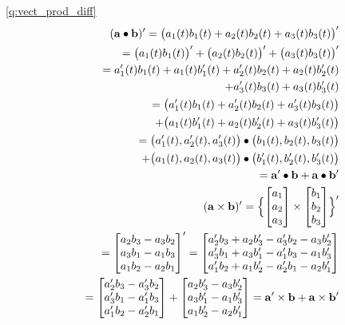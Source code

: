 \ref{q:vect_prod_diff}
\begin{eqnarray*}
&&({\bf a}\bullet{\bf b})'=\bigl(a_1(t)b_1(t)+a_2(t)b_2(t)+a_3(t)b_3(t)\bigr)'\\
&&=\bigl(a_1(t)b_1(t)\bigr)'+\bigl(a_2(t)b_2(t)\bigr)'+\bigl(a_3(t)b_3(t)\bigr)'\\
&&=a_1'(t)b_1(t)+a_1(t)b_1'(t)+a_2'(t)b_2(t)+a_2(t)b_2'(t)\\
&&\quad+a_3'(t)b_3(t)+a_3(t)b_3'(t)\\
&&=\bigl(a_1'(t)b_1(t)+a_2'(t)b_2(t)+a_3'(t)b_3(t)\bigr)\\
&&\quad+\bigl(a_1(t)b_1'(t)+a_2(t)b_2'(t)+a_3(t)b_3'(t)\bigr)\\
&&=\bigl(a_1'(t), a_2'(t), a_3'(t)\bigr)\bullet\bigl(b_1(t), b_2(t), b_3(t)\bigr)\\
&&\quad+\bigl(a_1(t), a_2(t), a_3(t)\bigr)\bullet\bigl(b_1'(t), b_2'(t), b_3'(t)\bigr)\\
&&={\bf a}'\bullet{\bf b}+{\bf a}\bullet{\bf b}'\\
&&({\bf a}\times{\bf b})'=\Bigl\{
\begin{bmatrix}
a_1\\
a_2\\
a_3\\
\end{bmatrix}
\times
\begin{bmatrix}
b_1\\
b_2\\
b_3\\
\end{bmatrix}
\Bigr\}'\\
&&=\begin{bmatrix}
a_2b_3-a_3b_2\\
a_3b_1-a_1b_3\\
a_1b_2-a_2b_1\\
\end{bmatrix}'
=\begin{bmatrix}
a_2'b_3+a_2b_3'-a_3'b_2-a_3b_2'\\
a_3'b_1+a_3b_1'-a_1'b_3-a_1b_3'\\
a_1'b_2+a_1b_2'-a_2'b_1-a_2b_1'\\
\end{bmatrix}\\
&&=\begin{bmatrix}
a_2'b_3-a_3'b_2\\
a_3'b_1-a_1'b_3\\
a_1'b_2-a_2'b_1\\
\end{bmatrix}
+\begin{bmatrix}
a_2b_3'-a_3b_2'\\
a_3b_1'-a_1b_3'\\
a_1b_2'-a_2b_1'\\
\end{bmatrix}
={\bf a}'\times{\bf b}+{\bf a}\times{\bf b}'
\end{eqnarray*}
\hv





